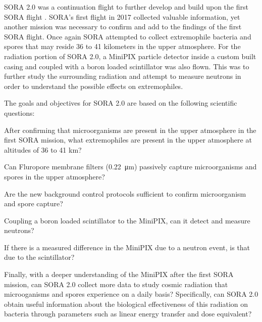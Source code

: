 SORA 2.0 was a continuation flight to further develop and build upon the first SORA flight \cite{SORA}.  SORA's first flight in 2017 collected valuable information, yet another mission was necessary to confirm and add to the findings of the first SORA flight.  Once again SORA attempted to collect extremophile bacteria and spores that may reside 36 to 41 kilometers in the upper atmosphere.  For the radiation portion of SORA 2.0, a MiniPIX particle detector inside a custom built casing and coupled with a boron loaded scintillator was also flown.  This was to further study the surrounding radiation and attempt to measure neutrons in order to understand the possible effects on extremophiles.  
 

The goals and objectives for SORA 2.0 are based on the following scientific questions: 
%
\begin{itemize}
	{\indentitem \item After confirming that microorganisms are present in the upper atmosphere in the first SORA mission, what extremophiles are present in the upper atmosphere at altitudes of 36 to 41 km?}
	{\indentitem \item Can Fluropore membrane filters (\SI{0.22}{\micro\meter}) passively capture microorganisms and spores in the upper atmosphere?}
	{\indentitem \item Are the new background control protocols sufficient to confirm microorganism and spore capture?} 
	{\indentitem \item Coupling a boron loaded scintillator to the MiniPIX, can it detect and measure neutrons? } 
	{\indentitem \item If there is a measured difference in the MiniPIX due to a neutron event, is that due to the scintillator?}
	{\indentitem \item Finally, with a deeper understanding of the MiniPIX after the first SORA mission, can SORA 2.0 collect more data to study cosmic radiation that microoganisms and spores experience on a daily basis? Specifically, can SORA 2.0 obtain useful information about the biological effectiveness of this radiation on bacteria through parameters such as linear energy transfer and dose equivalent?}
\end{itemize}
%

